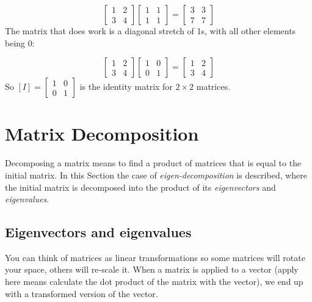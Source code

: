 \begin{equation*}
\begin{bmatrix}
1 & 2 \\
3 & 4
\end{bmatrix}
\begin{bmatrix}
1 & 1 \\
1 & 1
\end{bmatrix}
=
\begin{bmatrix}
3 & 3 \\
7 & 7
\end{bmatrix}
\end{equation*}
The matrix that does work is a diagonal stretch of 1s, with all other elements being 0:

\begin{equation*}
\begin{bmatrix}
1 & 2 \\
3 & 4
\end{bmatrix}
\begin{bmatrix}
1 & 0 \\
0 & 1
\end{bmatrix}
=
\begin{bmatrix}
1 & 2 \\
3 & 4
\end{bmatrix}
\end{equation*}
So $[I] = 
\begin{bmatrix}
1 & 0 \\
0 & 1
\end{bmatrix}
$ is the identity matrix for $2\times 2$ matrices. 
    
\section{Matrix Decomposition}
\label{eigendecomposition}

Decomposing a matrix means to find a product of matrices that is equal to the initial matrix. In this Section the case of \emph{eigen-decomposition} is described, where the initial matrix is decomposed into the product of its \emph{eigenvectors} and \emph{eigenvalues}.

\subsection{Eigenvectors and eigenvalues}
\label{eigenvectors-and-eigenvalues}

You can think of matrices as linear transformations so some matrices will rotate your space, others will re-scale it. When a matrix is applied to a vector (apply here means calculate the dot product of the matrix with the vector), we end up with a transformed version of the vector.

